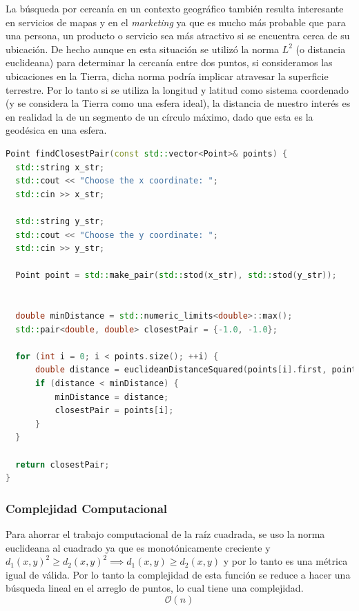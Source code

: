 \documentclass[12pt]{article}
\begin{document}
  La búsqueda por cercanía en un contexto geográfico también resulta interesante en servicios de mapas y en el \textit{marketing} ya que es mucho más probable que para una persona, un producto o 
  servicio sea más atractivo si se encuentra cerca de su ubicación. De hecho aunque en esta situación se utilizó la norma $L^{2}$ (o distancia euclideana) para determinar la cercanía entre dos puntos, 
  si consideramos las ubicaciones en la Tierra, dicha norma podría implicar atravesar la superficie terrestre. Por lo tanto si se utiliza la longitud y latitud como sistema 
  coordenado (y se considera la Tierra como una esfera ideal), la distancia de nuestro interés es en realidad la de un segmento de un círculo máximo, dado que esta es la geodésica en una esfera.
  \newpage
  \begin{lstlisting}[language=cpp, caption={Ubicación más cercana}, label={lst:nn}]
Point findClosestPair(const std::vector<Point>& points) {
  std::string x_str;
  std::cout << "Choose the x coordinate: ";
  std::cin >> x_str;

  std::string y_str;
  std::cout << "Choose the y coordinate: ";
  std::cin >> y_str;

  Point point = std::make_pair(std::stod(x_str), std::stod(y_str));


  double minDistance = std::numeric_limits<double>::max();
  std::pair<double, double> closestPair = {-1.0, -1.0};

  for (int i = 0; i < points.size(); ++i) {
      double distance = euclideanDistanceSquared(points[i].first, points[i].second, point.first, point.second);
      if (distance < minDistance) {
          minDistance = distance;
          closestPair = points[i];
      }
  }

  return closestPair;
}
  \end{lstlisting}

  \subsubsection{Complejidad Computacional}
  Para ahorrar el trabajo computacional de la raíz cuadrada, se uso la norma euclideana al cuadrado ya
  que es monotónicamente creciente y $d_{1}(x, y)^2 \geq d_{2}(x, y)^2 \implies d_{1}(x, y) \geq d_{2}(x, y)$ y por
  lo tanto es una métrica igual de válida. Por lo tanto la complejidad de esta función se reduce a hacer una búsqueda
  lineal en el arreglo de puntos, lo cual tiene una complejidad.
  \begin{equation}
    \mathcal{O}(n)
  \end{equation}
\end{document}
